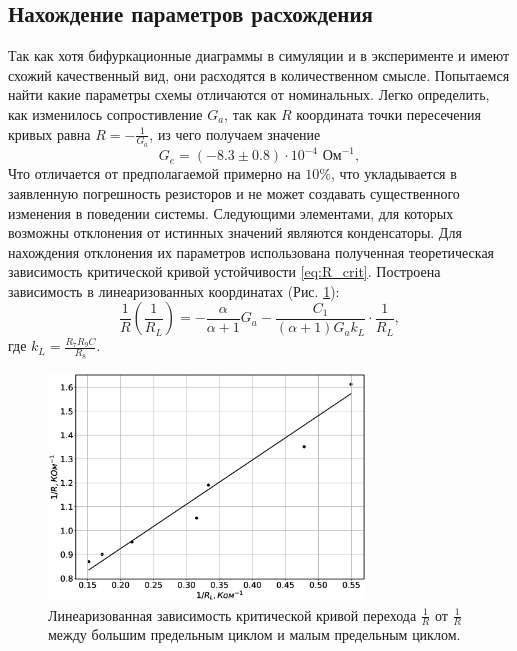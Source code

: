 \documentclass[12pt]{article}
\begin{document}
\subsection*{Нахождение параметров расхождения}
Так как хотя бифуркационные диаграммы в симуляции и в эксперименте и имеют схожий качественный вид, они 
расходятся в количественном смысле. Попытаемся найти какие параметры схемы отличаются от номинальных.
Легко определить, как изменилось сопростивление $G_a$, так как $R$ координата точки пересечения кривых 
равна $R = -\frac{1}{G_a}$, из чего получаем значение
\[
	G_e = (-8.3 \pm 0.8) \cdot 10^{-4} \text{ Ом}^{-1}, 
\]    
Что отличается от предполагаемой примерно на $10\%$, что укладывается в заявленную погрешность резисторов и 
не может создавать существенного изменения в поведении системы.  
Следующими элементами, для которых возможны отклонения от истинных значений являются конденсаторы. 
Для нахождения отклонения их параметров использована полученная теоретическая зависимость критической кривой устойчивости \ref{eq:R_crit}. 
Построена зависимость в линеаризованных координатах (Рис. \ref{fig:fit_coefs_line}): 
\[
	\frac{1}{R} \left( \frac{1}{R_L} \right) = -\frac{\alpha}{\alpha + 1} G_a - \frac{C_1}{(\alpha + 1) G_a k_L} \cdot \frac{1}{R_L},
\]
где $k_L = \frac{R_7 R_9 C}{R_8}$. 

\begin{figure}[H]
	\centering
	\includegraphics[width=0.75\textwidth]{fit_coefs_linear.eps}
	\caption{Линеаризованная зависимость критической кривой перехода $\frac{1}{R}$ от $\frac{1}{R}$ 
	между большим предельным циклом и малым предельным циклом.}
	\label{fig:fit_coefs_line}
\end{figure}
\end{document}
